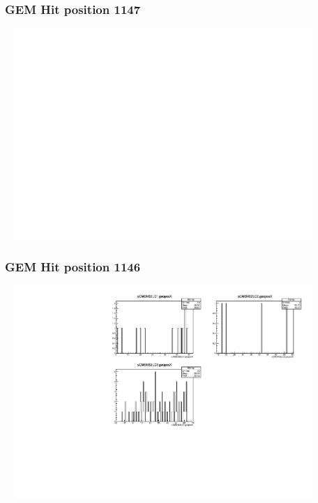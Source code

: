 \documentclass[slidestop,compress,mathserif]{beamer}
\begin{document}
\begin{frame}\frametitle{GEM Hit position 1147}
	 \includegraphics[width=12cm,height=8cm]{GEM_Hit_position_1147.pdf}
\end{frame}
\begin{frame}\frametitle{GEM Hit position 1146}
	 \includegraphics[width=12cm,height=8cm]{GEM_Hit_position_1146.pdf}
\end{frame}
\end{document}

